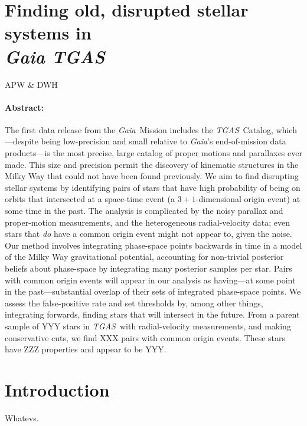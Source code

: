 \documentclass[12pt]{article}
\newcommand{\acronym}[1]{\small{{#1}}}
\newcommand{\project}[1]{\textsl{{#1}}}
\newcommand{\gaia}{\project{Gaia}}
\newcommand{\tgas}{\project{\acronym{TGAS}}}
\begin{document}
\section*{Finding old, disrupted stellar systems in \\ \textsl{Gaia TGAS}}

\noindent
APW \& DWH

\paragraph{Abstract:}
The first data release from the \gaia\ Mission includes the
\tgas\ Catalog, which---despite being low-precision and small relative
to \gaia's end-of-mission data products---is the most precise, large
catalog of proper motions and parallaxes ever made.
This size and precision permit the discovery of kinematic structures
in the Milky Way that could not have been found previously.
We aim to find disrupting stellar systems by identifying pairs of
stars that have high probability of being on orbits that intersected
at a space-time event (a $3+1$-dimensional origin event) at some time in the past.
The analysis is complicated by the noisy parallax and proper-motion
measurements, and the heterogeneous radial-velocity data; even stars
that \emph{do} have a common origin event might not appear to, given
the noise.
Our method involves integrating phase-space points backwards in time
in a model of the Milky Way gravitational potential, accounting for
non-trivial posterior beliefs about phase-space by integrating many
posterior samples per star.
Pairs with common origin events will appear in our analysis as
having---at some point in the past---substantial overlap of their sets
of integrated phase-space points.
We assess the false-positive rate and set thresholds by, among other things, integrating
forwards, finding stars that will intersect in the future.
From a parent sample of YYY stars in \tgas\ with radial-velocity
measurements, and making conservative cuts, we find XXX pairs with
common origin events.
These stars have ZZZ properties and appear to be YYY.

\section{Introduction}

Whatevs.
\end{document}
